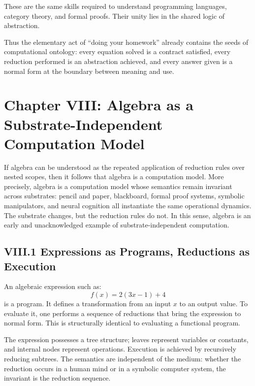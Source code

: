 \documentclass[12pt,letterpaper]{article}
\begin{document}
These are the same skills required to understand programming languages, category theory, and formal proofs. Their unity lies in the shared logic of abstraction.

Thus the elementary act of ``doing your homework'' already contains the seeds of computational ontology: every equation solved is a contract satisfied, every reduction performed is an abstraction achieved, and every answer given is a normal form at the boundary between meaning and use.

\newpage
\section{Chapter VIII: Algebra as a Substrate-Independent Computation Model}

If algebra can be understood as the repeated application of reduction rules over nested scopes, then it follows that algebra is a computation model. More precisely, algebra is a computation model whose semantics remain invariant across substrates: pencil and paper, blackboard, formal proof systems, symbolic manipulators, and neural cognition all instantiate the same operational dynamics. The substrate changes, but the reduction rules do not. In this sense, algebra is an early and unacknowledged example of substrate-independent computation.

\subsection{VIII.1 Expressions as Programs, Reductions as Execution}

An algebraic expression such as:
\[
f(x) = 2(3x - 1) + 4
\]
is a program. It defines a transformation from an input \(x\) to an output value. To evaluate it, one performs a sequence of reductions that bring the expression to normal form. This is structurally identical to evaluating a functional program.

The expression possesses a tree structure; leaves represent variables or constants, and internal nodes represent operations. Execution is achieved by recursively reducing subtrees. The semantics are independent of the medium: whether the reduction occurs in a human mind or in a symbolic computer system, the invariant is the reduction sequence.
\end{document}
